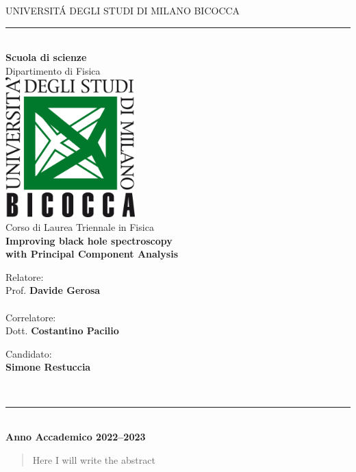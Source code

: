 \documentclass[a4paper, 12pt]{article}
\begin{document}
	\begin{titlepage}
	\begin{center}
            \Large{UNIVERSIT\'{A} DEGLI STUDI DI  MILANO BICOCCA} 
            \\[8pt]
            \hrule
            \\[20pt]
            {\bf \huge \sc Scuola di scienze} \\[10pt]
            {\huge Dipartimento di Fisica} \\[15pt]
            \includegraphics[width=5cm]{logo.png}\\[20pt]
            {\huge Corso di Laurea Triennale in Fisica}\\[50pt]
            {\Huge \bf Improving black hole spectroscopy\\[5pt] with Principal Component Analysis}\\[120pt]
            \begin{minipage}[t]{7.5cm}
	    {\large{Relatore: \\ Prof. \bf Davide Gerosa\\}}
            {\large{\\Correlatore: \\ Dott. \bf Costantino Pacilio}}
            \end{minipage}\hfill\begin{minipage}[t]{5cm}\raggedleft
	    {\large{Candidato: \\[5pt]\bf Simone Restuccia\\ }}
            \end{minipage}\\[50pt]
            \hrule
            \\[10pt]
            \bf \LARGE Anno Accademico 2022--2023
	\end{center}
	\end{titlepage}
        \restoregeometry
	\newpage                                
	\clearpage\null\thispagestyle{empty}\newpage
 	
\begin{abstract}
Here I will write the abstract
\end{abstract}
	
	
\newpage        
\tableofcontents                        
\clearpage\null\thispagestyle{empty}\newpage








    
 
	   
\end{document}
